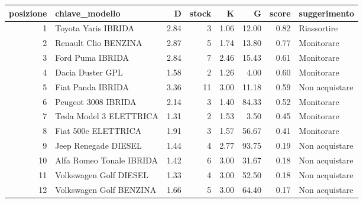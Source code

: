 \begin{tabular}{rlrrrrrl}
\toprule
posizione & chiave_modello & D & stock & K & G & score & suggerimento \\
\midrule
1 & Toyota Yaris IBRIDA & 2.84 & 3 & 1.06 & 12.00 & 0.82 & Riassortire \\
2 & Renault Clio BENZINA & 2.87 & 5 & 1.74 & 13.80 & 0.77 & Monitorare \\
3 & Ford Puma IBRIDA & 2.84 & 7 & 2.46 & 15.43 & 0.61 & Monitorare \\
4 & Dacia Duster GPL & 1.58 & 2 & 1.26 & 4.00 & 0.60 & Monitorare \\
5 & Fiat Panda IBRIDA & 3.36 & 11 & 3.00 & 11.18 & 0.59 & Non acquistare \\
6 & Peugeot 3008 IBRIDA & 2.14 & 3 & 1.40 & 84.33 & 0.52 & Monitorare \\
7 & Tesla Model 3 ELETTRICA & 1.31 & 2 & 1.53 & 3.50 & 0.45 & Monitorare \\
8 & Fiat 500e ELETTRICA & 1.91 & 3 & 1.57 & 56.67 & 0.41 & Monitorare \\
9 & Jeep Renegade DIESEL & 1.44 & 4 & 2.77 & 93.75 & 0.19 & Non acquistare \\
10 & Alfa Romeo Tonale IBRIDA & 1.42 & 6 & 3.00 & 31.67 & 0.18 & Non acquistare \\
11 & Volkswagen Golf DIESEL & 1.33 & 4 & 3.00 & 52.50 & 0.18 & Non acquistare \\
12 & Volkswagen Golf BENZINA & 1.66 & 5 & 3.00 & 64.40 & 0.17 & Non acquistare \\
\bottomrule
\end{tabular}
